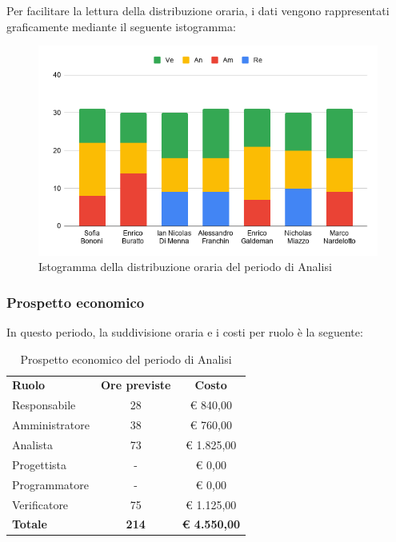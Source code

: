 \documentclass[../piano-di-progetto.tex]{subfiles}
\begin{document}
  Per facilitare la lettura della distribuzione oraria, i dati vengono rappresentati graficamente mediante il seguente istogramma:
  \begin{figure}[H]
    \centering
    \includegraphics[width=12cm]{img/ore-analisi.png}
    \caption{Istogramma della distribuzione oraria del periodo di Analisi}
    \label{fig:ore-componente-analisi}
  \end{figure}

  \subsubsection{Prospetto economico}
  In questo periodo, la suddivisione oraria e i costi per ruolo è la seguente:

  \begin{table}[H]
    \centering
    \begin{tabular}{lcc}

      \rowcolor{lightgray}
      \textbf{Ruolo}  & \textbf{Ore previste} & \textbf{Costo}  \\
      Responsabile    & 28           & € 840,00            \\
      Amministratore  & 38           & € 760,00            \\
      Analista        & 73           & € 1.825,00          \\
      Progettista     & -            & € 0,00              \\
      Programmatore   & -            & € 0,00              \\
      Verificatore    & 75           & € 1.125,00          \\
      \textbf{Totale} & \textbf{214} & \textbf{€ 4.550,00}
    \end{tabular}
    \caption{Prospetto economico del periodo di Analisi}
  \end{table}
\end{document}

